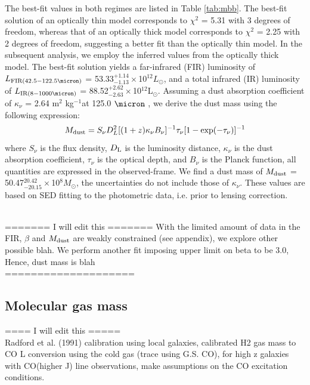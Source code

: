 \documentclass{emulateapj}
\newcommand{\Msun}{\mbox{$M_{\odot}$}}
\newcommand{\Lsun}{\mbox{L$_{\odot}$}}
\newcommand{\pmOne}{$^{-1}$}
\begin{document}

The best-fit values in both regimes are listed in Table \ref{tab:mbb}. The best-fit solution of an optically thin
model corresponds to $\chi^2$ = 5.31 with 3 degrees of freedom, whereas that of an optically thick model
corresponds to $\chi^2$ = 2.25 with 2 degrees of freedom, suggesting a better fit than the optically thin
model. In the subsequent analysis, we employ the inferred values from the optically thick model.
The best-fit solution yields a far-infrared (FIR) luminosity of $L_{\rm FIR (42.5-122.5\micron)}$ = 53.33$^{+1.14}_{-1.13}\times$10$^{12}L_
\odot$, and a total infrared (IR) luminosity of $L_{\rm IR (8-1000 \micron)}$ = 88.52$^{+2.62}_{-2.63}\times$10$
^{12}$\Lsun. Assuming a dust absorption coefficient of $\kappa_{\nu}$ = 2.64 m$^2$ kg\pmOne at 125.0 $
\micron$ \citep{Dunne03a}, we derive the dust mass using the following expression:
\begin{equation}
M_{\rm dust} = S_{\nu} D_{L}^2 [(1 + z) \kappa_{\nu} B_{\nu}]^{-1} \tau_{\nu} [1-
\exp(-\tau_{\nu})]^{-1}
\end{equation}
where $S_{\nu}$ is the flux density, $D_{\rm L}$ is the luminosity distance, $\kappa_{\nu}$ is the dust
absorption coefficient, $\tau_{\nu}$ is the optical depth, and $B_{\nu}$ is the Planck function,
all quantities are expressed in the observed-frame. We find a dust mass of $M_{\rm dust}$ =
50.47$^{20.42}_{-20.15}\times$10$^8$\Msun, the uncertainties do not include those of $\kappa_{\nu}$. These values are based on SED fitting to the photometric data, i.e. prior
to lensing correction.

\\ ======= I will edit this ======= 
With the limited amount of data in the FIR, $\beta$ and $M_{\rm dust}$ are weakly constrained (see appendix), we explore other possible blah.
We perform another fit imposing upper limit on beta to be 3.0, Hence, dust mass is blah
\\ ====================


\subsection{Molecular gas mass}
==== I will edit this ===== \\
Radford et al. (1991) calibration using local galaxies, calibrated H2 gas mass to CO L conversion using the cold gas (trace using G.S. CO), for high z galaxies with CO(higher J) line observations, make assumptions on the CO excitation conditions. 
\end{document}
